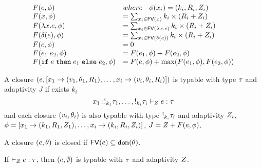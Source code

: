 \[
\begin{array}{ll}
 F(\expr, \phi ) & where \eapp ~~ \phi(x_i) = (\idx_i, \adapt_i, \nnatA_i ) \\
   F(x,\phi) & = \sum_{x_i \in \fv{x}  } \idx_i \times (\adapt_i+ \nnatA_i)  \\
F(\lambda x. \expr ,  \phi  ) & =  \sum_{x_i \in \fv{\lambda x.\expr}  } \idx_i \times (\adapt_i+ \nnatA_i)   \\  %
F(\delta(\expr) , \phi ) & = \sum_{x_i \in \fv{\delta(\expr)} } \idx_i \times (\adapt_i+ \nnatA_i)  \\
F(c, \phi ) & = 0  \\
F(\expr_1 \eapp \expr_2, \phi ) & = F(\expr_1, \phi ) +
                                  F(\expr_2,\phi ) \\
F(\eif \expr \ethen \expr_1 \eelse \expr_2, \phi ) & = F(\expr, \phi) + \max(F(\expr_1, \phi),  F(\expr_2, \phi)   )  
\end{array} 
\]

\begin{defn}[Typable]
  \label{typable}
  A closure $( e, [ x_1 \to (v_1 ,  \theta_1 , R_1 ) , \ldots, x_i \to (v_i, \theta_i, R_i )] )$ is typable with type $\tau$ and adaptivity $J$ if exists $k_i$\\
  \[
     x_1 : !_{k_1} \tau_1, \ldots, !_{k_i} \tau_i 
     \vdash_{Z}  e : \tau  \]
   and each closure $(v_i, \theta_i)$  is also typable with type $!_{k_i} \tau_i$ and adaptivity $Z_i$, $ \phi = [x_1
     \to (k_1, R_1, Z_1), \ldots,  x_i \to (k_i, R_i,
     Z_i)  ] $,  $J = Z + F( e, \phi ) $.
 \end{defn}

 \begin{defn}[ClosedClosure]
  \label{closure}
   A closure $(e, \theta)$ is closed if $\mathsf{FV} (e) \subseteq \mathtt{dom}(\theta)$. 
 \end{defn}

 

\begin{lem}[programTypable]
  \label{proglemma}
   If $ \vdash_{Z}   e : \tau $, then $(
     e, \emptyset ) $ is typable with $\tau$ and adaptivity $Z$. 
   \end{lem}

